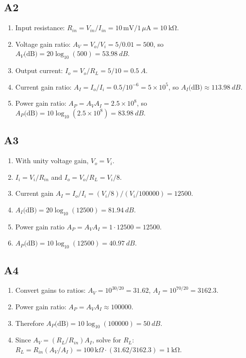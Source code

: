 \documentclass[12pt,a4paper]{article}
\begin{document}
\subsection{A2}
\begin{enumerate}
\item Input resistance: $R_{in}=V_{in}/I_{in}=10\,\text{mV}/1\,\mu\text{A}=\SI{10}{\kilo\ohm}$.
\item Voltage gain ratio: $A_V=V_o/V_i=5/0.01=500$, so $A_V\text{(dB)}=20\log_{10}(500)=\SI{53.98}{dB}$.
\item Output current: $I_o=V_o/R_L=5/10=\SI{0.5}{A}$.
\item Current gain ratio: $A_I=I_o/I_i=0.5/10^{-6}=5\times10^5$, so $A_I\text{(dB)}\approx\SI{113.98}{dB}$.
\item Power gain ratio: $A_P=A_VA_I=2.5\times10^8$, so $A_P\text{(dB)}=10\log_{10}(2.5\times10^8)=\SI{83.98}{dB}$.
\end{enumerate}

\subsection{A3}
\begin{enumerate}
\item With unity voltage gain, $V_o=V_i$.
\item $I_i=V_i/R_{in}$ and $I_o=V_o/R_L=V_i/8$.
\item Current gain $A_I=I_o/I_i=(V_i/8)/(V_i/100000)=12500$.
\item $A_I\text{(dB)}=20\log_{10}(12500)=\SI{81.94}{dB}$.
\item Power gain ratio $A_P=A_VA_I=1\cdot12500=12500$.
\item $A_P\text{(dB)}=10\log_{10}(12500)=\SI{40.97}{dB}$.
\end{enumerate}

\subsection{A4}
\begin{enumerate}
\item Convert gains to ratios: $A_V=10^{30/20}=31.62$, $A_I=10^{70/20}=3162.3$.
\item Power gain ratio: $A_P=A_VA_I\approx100000$.
\item Therefore $A_P\text{(dB)}=10\log_{10}(100000)=\SI{50}{dB}$.
\item Since $A_V=(R_L/R_{in})A_I$, solve for $R_L$: 
$R_L=R_{in}(A_V/A_I)=100\,\text{k}\Omega\cdot(31.62/3162.3)=\SI{1}{\kilo\ohm}$.
\end{enumerate}
\end{document}
